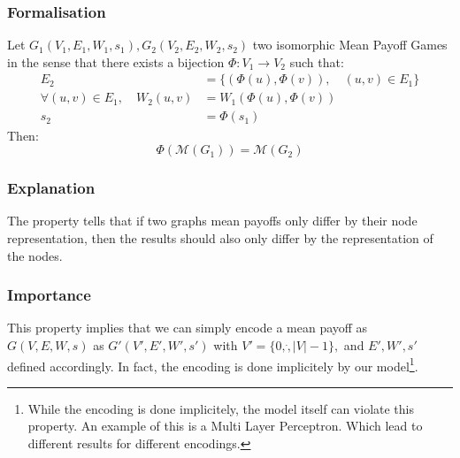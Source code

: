 \subsubsection{Formalisation}
Let $G_1(V_1,E_1,W_1,s_1),G_2(V_2,E_2,W_2,s_2)$ two isomorphic Mean Payoff Games in the sense that there exists a bijection $\Phi:V_1\rightarrow V_2$ such that:
\begin{align*}
	E_2&=\{(\Phi(u),\Phi(v)),\quad (u,v)\in E_1\}\\
	\forall (u,v)\in E_1,\quad W_2(u,v)&=W_1(\Phi(u),\Phi(v)) \\
	s_2&= \Phi(s_1)
\end{align*}
Then:
$$
\Phi\left(\mathcal{M}(G_1)\right) = \mathcal{M}(G_2)
$$
\subsubsection{Explanation}
The property tells that if two graphs mean payoffs only differ by their node representation, then the results should also only differ by the representation of the nodes.

\subsubsection{Importance}
This property implies that we can simply encode a mean payoff as $G(V,E,W,s)$ as $G'(V',E',W',s')$ with  $V'=\{0,\dot,\lvert V \rvert-1\},$ and $E',W',s'$ defined accordingly.
\newline In fact, the encoding is done implicitely by our model\footnote{While the encoding is done implicitely, the model itself can violate this property. An example of this is a Multi Layer Perceptron. Which lead to different results for different encodings.}.

